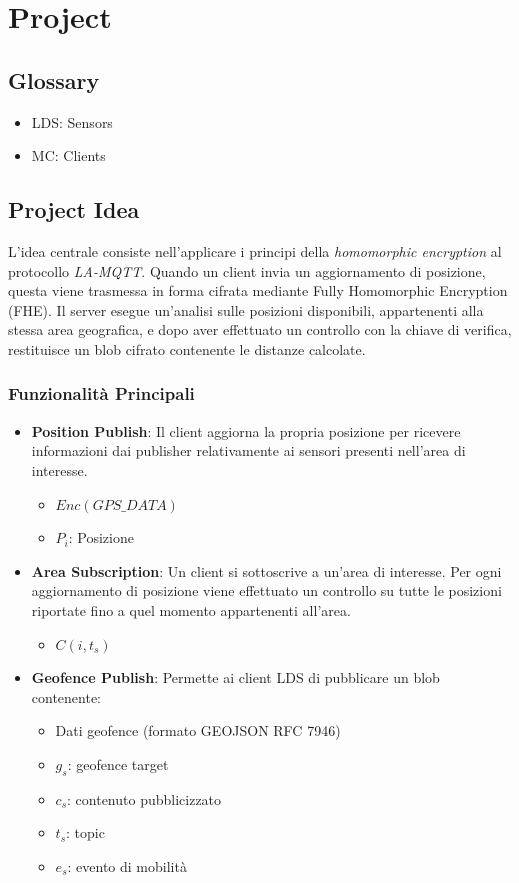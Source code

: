 \documentclass[12pt,a4paper,twoside]{book}
\begin{document}
\chapter{Project}
\section{Glossary}
\begin{itemize}
    \item LDS: Sensors
    \item MC: Clients
\end{itemize}

\section{Project Idea}
L'idea centrale consiste nell'applicare i principi della \emph{homomorphic encryption} al protocollo \emph{LA-MQTT}. Quando un client invia un aggiornamento di posizione, questa viene trasmessa in forma cifrata mediante Fully Homomorphic Encryption (FHE). Il server esegue un'analisi sulle posizioni disponibili, appartenenti alla stessa area geografica, e dopo aver effettuato un controllo con la chiave di verifica, restituisce un blob cifrato contenente le distanze calcolate.

\subsection{Funzionalità Principali}
\begin{itemize}
    \item \textbf{Position Publish}: Il client aggiorna la propria posizione per ricevere informazioni dai publisher relativamente ai sensori presenti nell'area di interesse.
    \begin{itemize}
        \item $Enc(GPS\_DATA)$
        \item $P_{i}$: Posizione
    \end{itemize}
    
    \item \textbf{Area Subscription}: Un client si sottoscrive a un'area di interesse. Per ogni aggiornamento di posizione viene effettuato un controllo su tutte le posizioni riportate fino a quel momento appartenenti all'area.
    \begin{itemize}
        \item $C(i, t_{s})$
    \end{itemize}
    
    \item \textbf{Geofence Publish}: Permette ai client LDS di pubblicare un blob contenente:
    \begin{itemize}
        \item Dati geofence (formato GEOJSON RFC 7946)
        \item $g_s$: geofence target
        \item $c_{s}$: contenuto pubblicizzato
        \item $t_{s}$: topic
        \item $e_{s}$: evento di mobilità
    \end{itemize}
\end{itemize}
\end{document}
